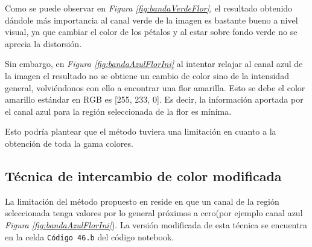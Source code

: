 \documentclass[11pt,twoside,titlepage,a4paper]{article}
\numberwithin{equation}{section} %
\theoremstyle{usual}
\begin{document}
Como se puede observar en \textit{Figura \ref{fig:bandaVerdeFlor}}, el resultado obtenido dándole más importancia al canal verde de la imagen es bastante bueno a nivel visual, ya que cambiar el color de los pétalos y al estar sobre fondo verde no se aprecia la distorsión.

Sin embargo, en \textit{Figura \ref{fig:bandaAzulFlorIni}} al intentar relajar al canal azul de la imagen el resultado no se obtiene un cambio de color sino de la intensidad general, volviéndonos con ello a encontrar una flor amarilla.  Esto se debe el color amarillo estándar en RGB es [255, 233, 0]. 
Es decir, la información aportada por el canal azul para la región seleccionada de la flor es mínima.    

Esto podría plantear que el método tuviera una limitación en cuanto a la obtención de toda la gama colores.

\subsection{Técnica de intercambio de color modificada}

La limitación del método propuesto en \cite{poissonImageEditing} reside en que un canal de la región seleccionada tenga valores por lo general próximos a cero(por ejemplo canal azul \textit{Figura \ref{fig:bandaAzulFlorIni}}). La versión modificada de esta técnica se encuentra en la celda \texttt{Código 46.b} del código notebook.
\end{document}
